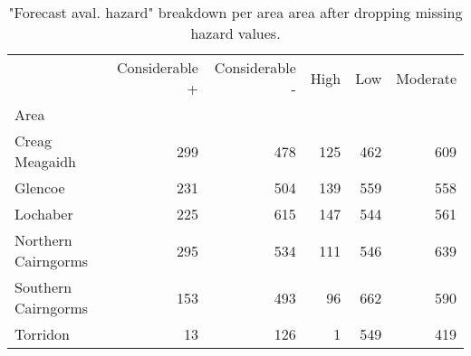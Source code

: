 \begin{table}[h]
\caption{"Forecast aval. hazard" breakdown per area area after dropping missing hazard values.}
\label{tbl:sais_hazard_breakdown_per_area}
\begin{tabular}{lrrrrr}
\toprule
 & Considerable + & Considerable - & High & Low & Moderate \\
Area &  &  &  &  &  \\
\midrule
Creag Meagaidh & 299 & 478 & 125 & 462 & 609 \\
Glencoe & 231 & 504 & 139 & 559 & 558 \\
Lochaber & 225 & 615 & 147 & 544 & 561 \\
Northern Cairngorms & 295 & 534 & 111 & 546 & 639 \\
Southern Cairngorms & 153 & 493 & 96 & 662 & 590 \\
Torridon & 13 & 126 & 1 & 549 & 419 \\
\bottomrule
\end{tabular}
\end{table}
